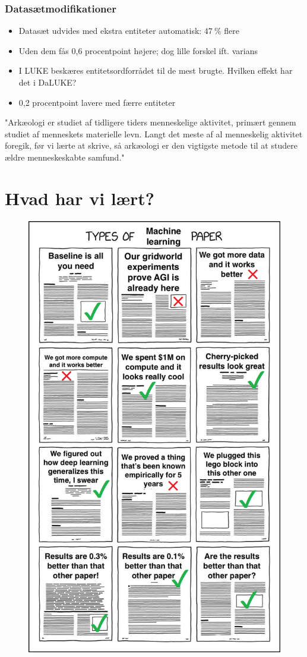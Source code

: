 \documentclass{beamer}
\newcommand{\unit}[1]{\ensuremath{\:\text{#1}}}
\newcommand{\pro}{\ensuremath{\unit{\%{}}}}
\begin{document}
\begin{frame}
    \frametitle{Datasætmodifikationer}
    \begin{itemize}
        \item Datasæt udvides med ekstra entiteter automatisk: $ 47\pro $ flere
        \item Uden dem fås 0,6 procentpoint højere; dog lille forskel ift. varians
        \item I LUKE beskæres entitetsordforrådet til de mest brugte. Hvilken effekt har det i DaLUKE?
        \item 0,2 procentpoint lavere med færre entiteter
    \end{itemize}
    \begin{example}
        "Arkæologi er studiet af tidligere tiders {\color{red}menneske}lige {\color{red}aktivitet}, primært gennem studiet af {menneske}ts materielle levn. Langt det meste af al {menneske}lig {\color{red}aktivitet} foregik, før vi lærte at skrive, så {arkæologi} er den vigtigste metode til at studere ældre {menneske}skabte samfund."
    \end{example}
\end{frame}

\section{Hvad har vi lært?}

\begin{frame}
    \begin{figure}[H]
        \centering
        \includegraphics[width=.4\textwidth]{types-of-ml}
    \end{figure}\noindent
\end{frame}
\end{document}
